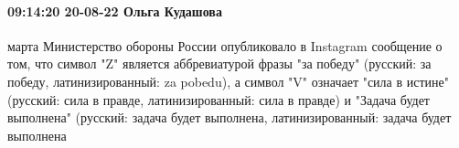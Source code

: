  
 
 
 
 

\paragraph{09:14:20 20-08-22 Ольга Кудашова}

марта Министерство обороны России опубликовало в Instagram сообщение о том, что
символ "Z" является аббревиатурой фразы "за победу" (русский: за победу,
латинизированный: za pobedu), а символ "V" означает "сила в истине" (русский:
сила в правде, латинизированный: сила в правде) и "Задача будет выполнена"
(русский: задача будет выполнена, латинизированный: задача будет выполнена

